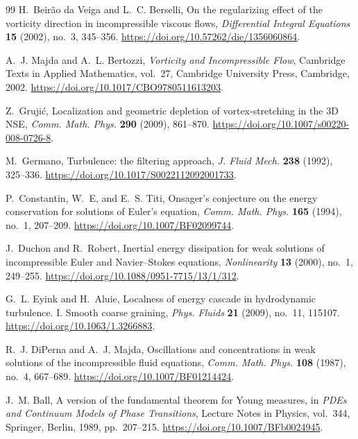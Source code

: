 \documentclass[11pt]{article}
\numberwithin{equation}{section}
\theoremstyle{plain}
\theoremstyle{definition}
\theoremstyle{remark}
\begin{document}
\begin{thebibliography}{99}
H.~Beir\~ao da Veiga and L.~C. Berselli,
\newblock On the regularizing effect of the vorticity direction in incompressible viscous flows,
\newblock \emph{Differential Integral Equations} \textbf{15} (2002), no.~3, 345--356.
\newblock \url{https://doi.org/10.57262/die/1356060864}.

A.~J. Majda and A.~L. Bertozzi,
\newblock \emph{Vorticity and Incompressible Flow},
\newblock Cambridge Texts in Applied Mathematics, vol.~27, Cambridge University Press, Cambridge, 2002.
\newblock \url{https://doi.org/10.1017/CBO9780511613203}.

Z.~Gruji\'c,
\newblock Localization and geometric depletion of vortex-stretching in the 3D NSE,
\newblock \emph{Comm. Math. Phys.} \textbf{290} (2009), 861--870.
\newblock \url{https://doi.org/10.1007/s00220-008-0726-8}.

M.~Germano,
\newblock Turbulence: the filtering approach,
\newblock \emph{J. Fluid Mech.} \textbf{238} (1992), 325--336.
\newblock \url{https://doi.org/10.1017/S0022112092001733}.

P.~Constantin, W.~E, and E.~S. Titi,
\newblock Onsager's conjecture on the energy conservation for solutions of Euler's equation,
\newblock \emph{Comm. Math. Phys.} \textbf{165} (1994), no.~1, 207--209.
\newblock \url{https://doi.org/10.1007/BF02099744}.

J.~Duchon and R.~Robert,
\newblock Inertial energy dissipation for weak solutions of incompressible Euler and Navier--Stokes equations,
\newblock \emph{Nonlinearity} \textbf{13} (2000), no.~1, 249--255.
\newblock \url{https://doi.org/10.1088/0951-7715/13/1/312}.

G.~L. Eyink and H.~Aluie,
\newblock Localness of energy cascade in hydrodynamic turbulence. I. Smooth coarse graining,
\newblock \emph{Phys. Fluids} \textbf{21} (2009), no.~11, 115107.
\newblock \url{https://doi.org/10.1063/1.3266883}.

R.~J. DiPerna and A.~J. Majda,
\newblock Oscillations and concentrations in weak solutions of the incompressible fluid equations,
\newblock \emph{Comm. Math. Phys.} \textbf{108} (1987), no.~4, 667--689.
\newblock \url{https://doi.org/10.1007/BF01214424}.

J.~M. Ball,
\newblock A version of the fundamental theorem for Young measures,
\newblock in \emph{PDEs and Continuum Models of Phase Transitions}, Lecture Notes in Physics, vol.~344, Springer, Berlin, 1989, pp.~207--215.
\newblock \url{https://doi.org/10.1007/BFb0024945}.


\end{thebibliography}
\end{document}
